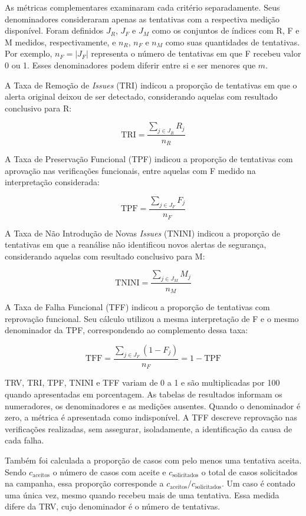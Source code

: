 As métricas complementares examinaram cada critério separadamente. Seus denominadores consideraram apenas as tentativas com a respectiva medição disponível. Foram definidos $J_R$, $J_F$ e $J_M$ como os conjuntos de índices com R, F e M medidos, respectivamente, e $n_R$, $n_F$ e $n_M$ como suas quantidades de tentativas. Por exemplo, $n_F = |J_F|$ representa o número de tentativas em que F recebeu valor 0 ou 1. Esses denominadores podem diferir entre si e ser menores que $m$.

A Taxa de Remoção de \textit{Issues} (TRI) indicou a proporção de tentativas em que o alerta original deixou de ser detectado, considerando aquelas com resultado conclusivo para R:

\[
\text{TRI} = \frac{\sum_{j \in J_R} R_j}{n_R}
\]

A Taxa de Preservação Funcional (TPF) indicou a proporção de tentativas com aprovação nas verificações funcionais, entre aquelas com F medido na interpretação considerada:

\[
\text{TPF} = \frac{\sum_{j \in J_F} F_j}{n_F}
\]

A Taxa de Não Introdução de Novas \textit{Issues} (TNINI) indicou a proporção de tentativas em que a reanálise não identificou novos alertas de segurança, considerando aquelas com resultado conclusivo para M:

\[
\text{TNINI} = \frac{\sum_{j \in J_M} M_j}{n_M}
\]

A Taxa de Falha Funcional (TFF) indicou a proporção de tentativas com reprovação funcional. Seu cálculo utilizou a mesma interpretação de F e o mesmo denominador da TPF, correspondendo ao complemento dessa taxa:

\[
\text{TFF} = \frac{\sum_{j \in J_F} (1 - F_j)}{n_F} = 1 - \text{TPF}
\]

TRV, TRI, TPF, TNINI e TFF variam de 0 a 1 e são multiplicadas por 100 quando apresentadas em porcentagem. As tabelas de resultados informam os numeradores, os denominadores e as medições ausentes. Quando o denominador é zero, a métrica é apresentada como indisponível. A TFF descreve reprovação nas verificações realizadas, sem assegurar, isoladamente, a identificação da causa de cada falha.

Também foi calculada a proporção de casos com pelo menos uma tentativa aceita. Sendo $c_{\text{aceitos}}$ o número de casos com aceite e $c_{\text{solicitados}}$ o total de casos solicitados na campanha, essa proporção corresponde a $c_{\text{aceitos}} / c_{\text{solicitados}}$. Um caso é contado uma única vez, mesmo quando recebeu mais de uma tentativa. Essa medida difere da TRV, cujo denominador é o número de tentativas.

